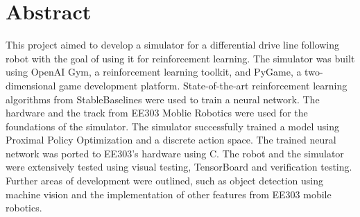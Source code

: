 \documentclass[a4paper,12pt]{article}
\begin{document}
\pagestyle{fancy}
\renewcommand{\chaptermark}[1]{\markboth{#1}{#1}}
\fancyhead[R]{}
\fancyhead[L]{\chaptername\ \thechapter\\ \leftmark}

\clearpage


\section{Abstract}
This project aimed to develop a simulator for a differential drive line following robot with the goal of using it for reinforcement learning. The simulator was built using OpenAI Gym, a reinforcement learning toolkit, and PyGame, a two-dimensional game development platform. State-of-the-art reinforcement learning algorithms from StableBaselines were used to train a neural network. The hardware and the track from EE303 Moblie Robotics were used for the foundations of the simulator. The simulator successfully trained a model using Proximal Policy Optimization and a discrete action space. The trained neural network was ported to EE303's hardware using C. The robot and the simulator were extensively tested using visual testing, TensorBoard and verification testing. Further areas of development were outlined, such as object detection using machine vision and the implementation of other features from EE303 mobile robotics.


\pagebreak
\end{document}
